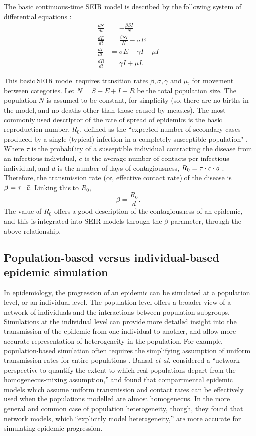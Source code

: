 The basic continuous-time SEIR model is described by the following system of differential equations \cite{IDM_2019, chitnis_2017}:
\begin{align*}
    \frac{dS}{dt} &= -\frac{\beta SI}{N} \\
    \frac{dE}{dt} &= \frac{\beta SI}{N} - \sigma E \\
    \frac{dI}{dt} &= \sigma E - \gamma I - \mu I\\
    \frac{dR}{dt} &= \gamma I + \mu I.
\end{align*}

This basic SEIR model requires transition rates $\beta, \sigma, \gamma \text{ and } \mu$, for movement between categories. Let $N = S + E + I + R$ be the total population size. The population $N$ is assumed to be constant, for simplicity (so, there are no births in the model, and no deaths other than those caused by measles). 
The most commonly used descriptor of the rate of spread of epidemics is the basic reproduction number, $R_{0}$, defined as the ``expected number of secondary cases produced by a single (typical) infection in a completely susceptible population" \cite{jones_2007}. 
Where $\tau$ is the probability of a susceptible individual contracting the disease from an infectious individual, $\Bar{c}$ is the average number of contacts per infectious individual, and $d$ is the number of days of contagiousness, $R_{0} = \tau \cdot \Bar{c} \cdot d$ \cite{jones_2007}.
Therefore, the transmission rate (or, effective contact rate) of the disease is $\beta = \tau \cdot \Bar{c}$. Linking this to $R_{0}$, $$\beta = \frac{R_{0}}{d}.$$ 
The value of $R_{0}$ offers a good description of the contagiousness of an epidemic, and this is integrated into SEIR models through the $\beta$ parameter, through the above relationship.

\subsection{Population-based versus individual-based epidemic simulation}
In epidemiology, the progression of an epidemic can be simulated at a population level, or an individual level. The population level offers a broader view of a network of individuals and the interactions between population subgroups. Simulations at the individual level can provide more detailed insight into the transmission of the epidemic from one individual to another, and allow more accurate representation of heterogeneity in the population. For example, population-based simulation often requires the simplifying assumption of uniform transmission rates for entire populations \cite{bansal2007individual}. 
Bansal \textit{et al.} \cite{bansal2007individual} considered a ``network perspective to quantify the extent to which real populations depart from the homogeneous-mixing assumption,'' and found that compartmental epidemic models which assume uniform transmission and contact rates can be effectively used when the populations modelled are almost homogeneous. In the more general and common case of population heterogeneity, though, they found that network models, which ``explicitly model heterogeneity,'' are more accurate for simulating epidemic progression. 

